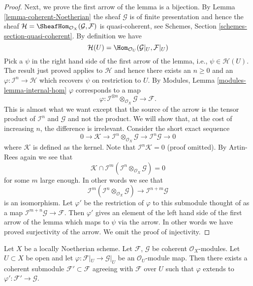 \begin{proof}
\medskip\noindent
Next, we prove the first arrow of the lemma is a bijection.
By Lemma \ref{lemma-coherent-Noetherian} the sheaf $\mathcal{G}$
is of finite presentation and hence the sheaf
$\mathcal{H} = \SheafHom_{\mathcal{O}_X}(\mathcal{G}, \mathcal{F})$
is quasi-coherent, see
Schemes, Section \ref{schemes-section-quasi-coherent}.
By definition we have
$$
\mathcal{H}(U)
=
\Hom_{\mathcal{O}_U}(\mathcal{G}|_U, \mathcal{F}|_U)
$$
Pick a $\psi$ in the right hand side of the first arrow of the
lemma, i.e.,  $\psi \in \mathcal{H}(U)$. The result just proved applies
to $\mathcal{H}$ and hence there exists an $n \geq 0$ and an
$\varphi : \mathcal{I}^n \to \mathcal{H}$ which recovers
$\psi$ on restriction to $U$. By
Modules, Lemma \ref{modules-lemma-internal-hom}
$\varphi$ corresponds to a map
$$
\varphi :
\mathcal{I}^{\otimes n} \otimes_{\mathcal{O}_X} \mathcal{G}
\longrightarrow
\mathcal{F}.
$$
This is almost what we want except that the source of the arrow
is the tensor product of $\mathcal{I}^n$ and $\mathcal{G}$
and not the product. We will show that, at the cost of increasing $n$,
the difference is irrelevant. Consider the short exact sequence
$$
0 \to \mathcal{K} \to
\mathcal{I}^n \otimes_{\mathcal{O}_X} \mathcal{G} \to
\mathcal{I}^n\mathcal{G} \to 0
$$
where $\mathcal{K}$ is defined as the kernel. Note that
$\mathcal{I}^n\mathcal{K} = 0$ (proof omitted). By Artin-Rees
again we see that
$$
\mathcal{K}
\cap
\mathcal{I}^m(\mathcal{I}^n \otimes_{\mathcal{O}_X} \mathcal{G})
=
0
$$
for some $m$ large enough. In other words we see that
$$
\mathcal{I}^m(\mathcal{I}^n \otimes_{\mathcal{O}_X} \mathcal{G})
\longrightarrow
\mathcal{I}^{n + m}\mathcal{G}
$$
is an isomorphism. Let $\varphi'$ be the restriction of
$\varphi$ to this submodule thought of as a map
$\mathcal{I}^{m + n}\mathcal{G} \to \mathcal{F}$.
Then $\varphi'$ gives an element
of the left hand side of the first arrow of the lemma which
maps to $\psi$ via the arrow. In other words we have proved surjectivity
of the arrow. We omit the proof of injectivity.
\end{proof}

\begin{lemma}
\label{lemma-extend-coherent}
Let $X$ be a locally Noetherian scheme. Let $\mathcal{F}$, $\mathcal{G}$
be coherent $\mathcal{O}_X$-modules. Let $U \subset X$ be open and
let $\varphi : \mathcal{F}|_U \to \mathcal{G}|_U$ be an
$\mathcal{O}_U$-module map. Then there exists a coherent
submodule $\mathcal{F}' \subset \mathcal{F}$ agreeing with
$\mathcal{F}$ over $U$ such that $\varphi$ extends to
$\varphi' : \mathcal{F}' \to \mathcal{G}$.
\end{lemma}

